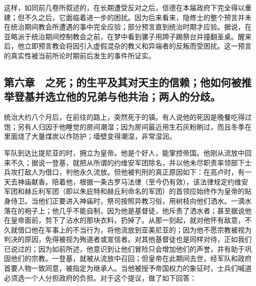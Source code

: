 这样，如同前几卷所叙述的，在长期遭受反对之后，信德在本届政府下完全得以重建；但不久之后，它面临着进一步的困扰。因为后来看来，隐修士的整个预言并未在统治期间教会所遭遇的事中完全应验；部分预言直到统治时期才应验。据说，在亚略派于统治期间控制教会之前，在梦中看到骡子用蹄子踢祭台并撞翻圣桌。醒来后，他立即预言教会将因引入虚假混杂的教义和异端者的反叛而受困扰。这一预言的真实性被当前所论时期前后发生的事件所证实。\par


\subsection{第六章　之死；的生平及其对天主的信赖；他如何被推举登基并选立他的兄弟与他共治；两人的分歧。}

统治大约八个月后，在前往的路上，突然死于的镇。有人说他的死因是晚餐吃得过饱；另有人归因于他睡觉的房间潮湿；因为房间最近用生石灰粉刷过，而且冬季在里面烧了大量煤炭以作防护；墙壁变得潮湿，非常湿润。\par

军队到达比提尼亚的时，拥立为皇帝。他是个好人，能掌控帝国。他刚从流放中回来不久；据说一登基，就把从所谓的约维安军团除名，并以他未尽职责率领部下士兵攻打敌人为借口，判他永久流放。但他被判刑的真正原因如下：在高卢时，有一天去神庙献香。陪着他，根据一条古罗马法律（至今仍有效），该法律规定约维安军团和赫丘利军团（即以朱庇特和赫丘利命名的军团）的首领应始终作为皇帝的贴身侍卫。当他们正要进入神庙时，祭司按照异教习俗，用树枝向他们洒水。一滴水落在的袍子上；他几乎不能自制，因为他是基督徒，他斥责了洒水者；甚至据说他在皇帝面前，剪下了沾水的那块衣料，扔掉了。从那一刻起，就对他怀有敌意，不久就借口他在军事上的不当行为，将他流放到亚美尼亚的；因为他不愿宗教被视为判决的原因，免得被视为殉道者或宣信者。对其他基督徒也是同样对待，正如我们已说过的；因为如前所述，他意识到让他们冒险只会增加他们的声誉，并有助于巩固他们的宗教。一登基，就被从流放中召回；但皇帝在此期间去世，经军队和政府首要人物一致同意，被指定为继承人。当他被授予帝国权力的象征时，士兵们喊道必须选一个人分担政府的负担。对于这个提议，做了如下回答：\par

